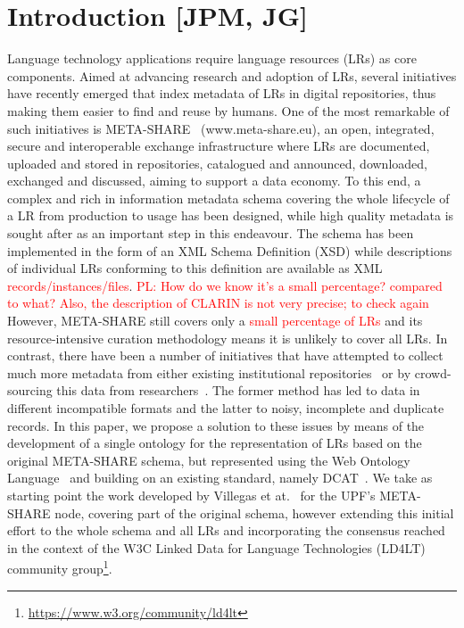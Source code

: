\documentclass{llncs}
\begin{document}
\section{Introduction [JPM, JG]}
\label{sec:introduction}
Language technology applications require language resources (LRs) as core components. Aimed at advancing research and adoption of LRs, several initiatives have recently emerged that index metadata of LRs in digital repositories, thus making them easier to find and reuse by humans. One of the most remarkable of such initiatives is META-SHARE~\cite{piperidis2012meta} (www.meta-share.eu), an open, integrated, secure and interoperable exchange infrastructure where LRs are documented, uploaded and stored in repositories, catalogued and announced, downloaded, exchanged and discussed, aiming to support a data economy. To this end, a complex and rich in information metadata schema covering the whole lifecycle of a LR from production to usage has been designed, while high quality metadata is sought after as an important step in this endeavour. The schema has been implemented in the form of an XML Schema Definition (XSD) while descriptions of individual LRs conforming to this definition are available as XML \textcolor{red}{records/instances/files}.
\textcolor{red}{PL: How do we know it's a small percentage? compared to what? Also, the description of CLARIN is not very precise; to check again}
However, META-SHARE still covers only a \textcolor{red}{small percentage of LRs} and its
resource-intensive curation methodology means it is unlikely to cover all
LRs. In contrast, there have been a number of initiatives that have
attempted to collect much more metadata from either existing institutional
repositories~\cite[CLARIN]{broeder2010data} or by crowd-sourcing this data from
researchers~\cite[LRE-Map]{calzolari2012lre}. The former method has led to
data in different incompatible formats and the latter to noisy, incomplete and
duplicate records.
In this paper, we propose a solution to these issues by means of the development
of a single ontology for the representation of LRs based on the
original META-SHARE schema, but represented using the Web Ontology
Language~\cite{motik2012owl} and building on an existing standard, namely
DCAT~\cite{maali2014data}.
We take as starting point the work developed by Villegas et at.~\cite{Villegas2014} for the UPF's META-SHARE node, covering part of the original schema, however extending this initial effort to the whole schema and all LRs and incorporating the consensus reached in the context of the W3C Linked Data for Language Technologies (LD4LT) community group\footnote{\url{https://www.w3.org/community/ld4lt}}.
\end{document}
